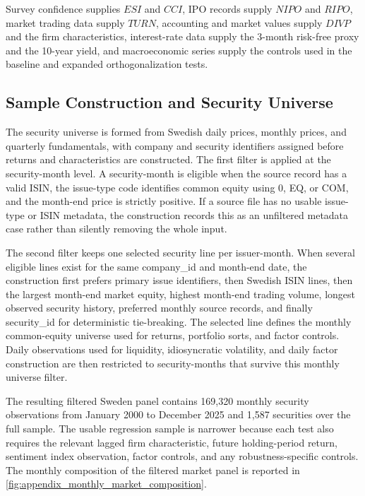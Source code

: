 \documentclass[11pt]{article}
\newcommand{\var}[1]{\ensuremath{#1}}
\newcommand{\repo}[1]{\textnormal{\small #1}}
\begin{document}
Survey confidence supplies \var{ESI} and \var{CCI}, IPO records supply \var{NIPO} and \var{RIPO}, market trading data supply \var{TURN}, accounting and market values supply \var{DIVP} and the firm characteristics, interest-rate data supply the 3-month risk-free proxy and the 10-year yield, and macroeconomic series supply the controls used in the baseline and expanded orthogonalization tests.

\subsection{Sample Construction and Security Universe}
The security universe is formed from Swedish daily prices, monthly prices, and quarterly fundamentals, with company and security identifiers assigned before returns and characteristics are constructed. The first filter is applied at the security-month level. A security-month is eligible when the source record has a valid ISIN, the issue-type code identifies common equity using \repo{0}, \repo{EQ}, or \repo{COM}, and the month-end price is strictly positive. If a source file has no usable issue-type or ISIN metadata, the construction records this as an unfiltered metadata case rather than silently removing the whole input.

The second filter keeps one selected security line per issuer-month. When several eligible lines exist for the same \repo{company\_id} and month-end date, the construction first prefers primary issue identifiers, then Swedish ISIN lines, then the largest month-end market equity, highest month-end trading volume, longest observed security history, preferred monthly source records, and finally \repo{security\_id} for deterministic tie-breaking. The selected line defines the monthly common-equity universe used for returns, portfolio sorts, and factor controls. Daily observations used for liquidity, idiosyncratic volatility, and daily factor construction are then restricted to security-months that survive this monthly universe filter.

The resulting filtered Sweden panel contains 169,320 monthly security observations from January 2000 to December 2025 and 1,587 securities over the full sample. The usable regression sample is narrower because each test also requires the relevant lagged firm characteristic, future holding-period return, sentiment index observation, factor controls, and any robustness-specific controls. The monthly composition of the filtered market panel is reported in \cref{fig:appendix_monthly_market_composition}.
\end{document}
